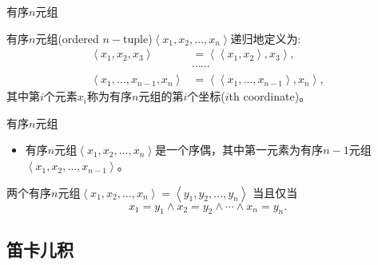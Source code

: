 
\begin{frame}{有序$n$元组}
\pause
\begin{defi}
  \alert{有序$n$元组(ordered $n-$tuple)}$\left\langle x_1,x_2,\ldots,x_n\right\rangle$递归地定义为:
  \begin{equation*}
    \begin{aligned}
      \left\langle x_1,x_2,x_3 \right\rangle&=\left\langle\left\langle x_1,x_2 \right\rangle,x_3 \right\rangle,\\
      &\cdots\cdots \\
     \left\langle x_1,\ldots,x_{n-1},x_n \right\rangle&=\left\langle\left\langle x_1,\ldots,x_{n-1} \right\rangle,x_{n} \right\rangle,
    \end{aligned}
  \end{equation*}
  其中第$i$个元素$x_i$称为有序$n$元组的\alert{第$i$个坐标($i$th coordinate)}。
\end{defi}

\end{frame}


\begin{frame}{有序$n$元组}
\pause
\begin{itemize}
  \item 有序$n$元组$\left\langle x_1,x_2,\ldots,x_n\right\rangle$是一个序偶，其中第一元素为有序$n-1$元组$\left\langle x_1,x_2,\ldots,x_{n-1}\right\rangle$。
\end{itemize}
\vspace{2ex}
\pause
\begin{thm}
  两个有序$n$元组$\left\langle x_1,x_2,\ldots,x_n\right\rangle=\left\langle y_1,y_2,\ldots,y_n\right\rangle$ 当且仅当
  \[x_1=y_1\land x_2=y_2\land\cdots\land x_n=y_n.\]
\end{thm}
\end{frame}


\subsection{笛卡儿积}


